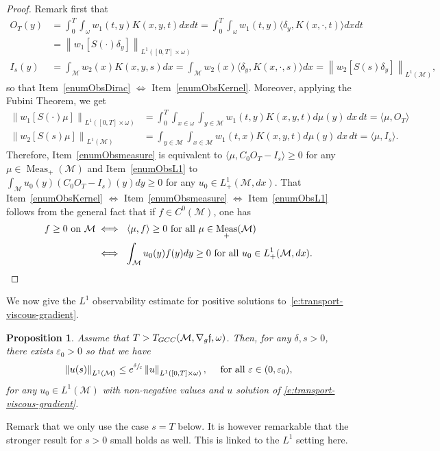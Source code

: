 \documentclass[11pt]{article}
\numberwithin{equation}{section}
\newcommand{\GCC}{\textup{GCC}}
\newtheorem{proposition}[lemma]{Proposition}
\theoremstyle{definition}
\newcommand{\M}{\ensuremath{\mathcal M}}
\newcommand{\f}{\ensuremath{\mathfrak{f}}}
\DeclareMathOperator{\Meas}{Meas}
\newcommand\bnp{\begin{proof}}
\newcommand\enp{\end{proof}}
\newcommand\nor[2]{\left\|#1\right\|_{#2}}
\let\e\varepsilon
\let\eps\varepsilon
\begin{document}
\bnp
Remark first that
\begin{align*}
O_T(y)& =\int_0^T \int_{\omega} w_1(t,y)K(x,y,t)dx dt = \int_0^T \int_{\omega} w_1(t,y)\langle \delta_y, K(x,\cdot,t ) \rangle dx dt \\
& = \nor{w_1 \left[S(\cdot) \delta_y \right]}{L^1([0,T]\times \omega)}\\
I_s (y)& =\int_{\M} w_2(x)K(x,y, s)dx = \int_{\M}w_2(x)\langle \delta_y, K(x,\cdot,s)\rangle dx = \nor{w_2 \left[S(s) \delta_y \right]}{L^1(\M)},
\end{align*}
so that Item~\eqref{enumObsDirac} $\Leftrightarrow$ Item~\eqref{enumObsKernel}. Moreover, applying the Fubini Theorem, we get
\begin{align*}
\nor{w_1 [S(\cdot)\mu]}{L^1([0,T]\times \omega)} &=\int_0^T \int_{x\in \omega}\int_{y\in \M} w_1(t,y)K(x,y,t)d\mu(y)\,dx\,dt=\langle \mu, O_T \rangle\\
\nor{w_2 \left[S(s)\mu\right]}{L^1(\M)}&=\int_{y\in \M}\int_{x\in \M} w_1(t,x)K(x,y,t)d\mu(y)\,dx\,dt=\langle \mu, I_s \rangle.
\end{align*}
Therefore, Item~\eqref{enumObsmeasure} is equivalent to $\langle \mu, C_0O_T-I_s \rangle \geq 0$ for any $\mu \in \Meas_+(\M)$ and Item~\eqref{enumObsL1} to $\int_\M u_0(y) (C_0O_T-I_s )(y) dy \geq 0$ for any $u_0 \in L^1_+(\M,dx)$. That Item~\eqref{enumObsKernel} $\Leftrightarrow$ Item~\eqref{enumObsmeasure} $\Leftrightarrow$ Item~\eqref{enumObsL1} follows from the general fact that if $f \in C^0(\M)$, one has
\begin{align*}
f \geq 0 \text{ on }\M & \iff \ \langle \mu, f \rangle \geq 0 \text{ for all }\mu \in \Meas_+(\M) \\
& \iff \ \int_\M u_0(y) f(y) dy \geq 0\text{ for all }u_0 \in L^1_+(\M,dx).\qedhere
\end{align*}
\enp
We now give the $L^1$ observability estimate for positive solutions to~\eqref{e:transport-viscous-gradient}.
\begin{proposition}
\label{propobsL1}
Assume that $T>T_{\GCC}(\M, \nabla_g\f,\omega)$. Then, for any $\delta, s >0$, there exists $\e_0>0$ so that we have
\begin{equation}
\label{estimL1+}
\nor{u(s)}{L^1(\M)}\leq e^{\sfrac{\delta}{\e}}\nor{u}{L^1([0,T]\times \omega)}, \quad \text{ for all } \eps \in (0,\eps_0),
\end{equation}
for any $u_0\in L^1(\M)$ with non-negative values and $u$ solution of \eqref{e:transport-viscous-gradient}.
\end{proposition}
Remark that we only use the case $s=T$ below. It is however remarkable that the stronger result for $s >0$ small holds as well. This is linked to the $L^1$ setting here.
\end{document}
